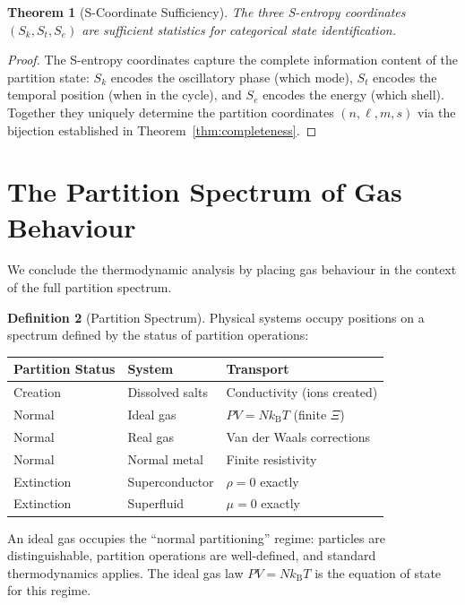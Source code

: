 \documentclass[twocolumn,10pt,a4paper]{article}
\theoremstyle{plain}
\newtheorem{theorem}{Theorem}[section]
\theoremstyle{definition}
\newtheorem{definition}[theorem]{Definition}
\theoremstyle{remark}
\newcommand{\kB}{k_{\mathrm{B}}}
\begin{document}
\begin{theorem}[S-Coordinate Sufficiency]
\label{thm:s_sufficiency}
The three S-entropy coordinates $(S_k, S_t, S_e)$ are sufficient statistics for categorical state identification.
\end{theorem}

\begin{proof}
The S-entropy coordinates capture the complete information content of the partition state: $S_k$ encodes the oscillatory phase (which mode), $S_t$ encodes the temporal position (when in the cycle), and $S_e$ encodes the energy (which shell). Together they uniquely determine the partition coordinates $(n, \ell, m, s)$ via the bijection established in Theorem~\ref{thm:completeness}.
\end{proof}

\section{The Partition Spectrum of Gas Behaviour}
\label{sec:spectrum}

We conclude the thermodynamic analysis by placing gas behaviour in the context of the full partition spectrum.

\begin{definition}[Partition Spectrum]
Physical systems occupy positions on a spectrum defined by the status of partition operations:
\begin{center}
\begin{tabular}{lll}
\toprule
Partition Status & System & Transport \\
\midrule
Creation & Dissolved salts & Conductivity (ions created) \\
Normal & Ideal gas & $PV = N\kB T$ (finite $\Xi$) \\
Normal & Real gas & Van der Waals corrections \\
Normal & Normal metal & Finite resistivity \\
Extinction & Superconductor & $\rho = 0$ exactly \\
Extinction & Superfluid & $\mu = 0$ exactly \\
\bottomrule
\end{tabular}
\end{center}
\end{definition}

An ideal gas occupies the ``normal partitioning'' regime: particles are distinguishable, partition operations are well-defined, and standard thermodynamics applies. The ideal gas law $PV = N\kB T$ is the equation of state for this regime.
\end{document}
